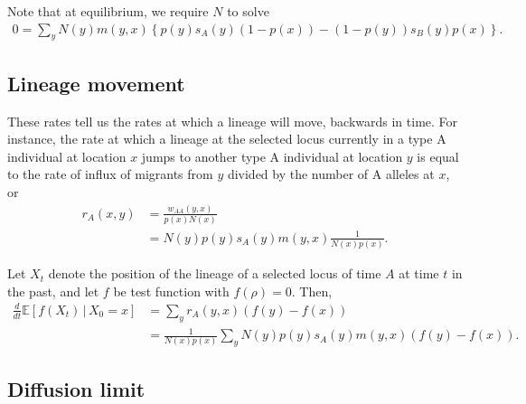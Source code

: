 \documentclass[11pt,letterpaper]{article}
\newcommand{\E}{\mathbb{E}}
\newcommand{\deriv}[1]{\frac{d}{d#1}}
\newcommand{\given}{\,\vert\,}
\begin{document}
Note that at equilibrium, we require $N$ to solve
\begin{align*}
  0 = \sum_y N(y) m(y,x) \left\{ p(y)s_A(y)(1-p(x)) - (1-p(y))s_B(y)p(x) \right\} .
\end{align*}

\subsection*{Lineage movement}

These rates tell us the rates at which a lineage will move, backwards in time.
For instance, the rate at which a lineage at the selected locus
currently in a type A individual at location $x$
jumps to another type A individual at location $y$ is equal to the rate of influx of migrants from $y$
divided by the number of A alleles at $x$,
or
\begin{align*}
  r_A(x,y) &= \frac{w_{AA}(y,x)}{p(x)N(x)} \\
  &= N(y) p(y) s_A(y) m(y,x) \frac{ 1 }{ N(x) p(x) } .
\end{align*}

Let $X_t$ denote the position of the lineage of a selected locus of time $A$ at time $t$ in the past,
and let $f$ be test function with $f(\rho)=0$.
Then,
\begin{align}
    \deriv{t} \E[f(X_t) \given X_0=x ] &= \sum_y r_{A}(y,x) ( f(y)-f(x) ) \\
    &= \frac{1}{N(x)p(x)} \sum_y  N(y) p(y) s_A(y) m(y,x) ( f(y) - f(x)  ) . \label{eqn:discrete_generator}
\end{align}


\subsection*{Diffusion limit}
\end{document}
